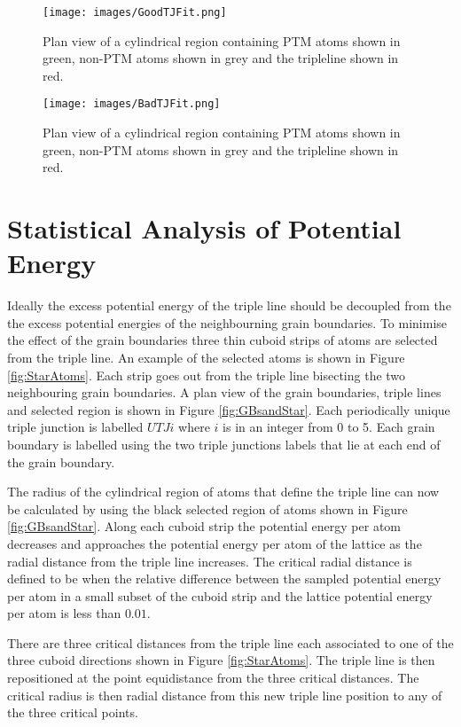 \documentclass[12pt,a4paper]{book}
\begin{document}
\begin{figure}
	\texttt{[image: images/GoodTJFit.png]} 
	\caption{Plan view of a cylindrical region containing PTM atoms shown in green, non-PTM atoms shown in grey and the tripleline shown in red.}
\end{figure}
\begin{figure}
	\texttt{[image: images/BadTJFit.png]} 
	\caption{Plan view of a cylindrical region containing PTM atoms shown in green, non-PTM atoms shown in grey and the tripleline shown in red.}
\end{figure}
\section{Statistical Analysis of Potential Energy}


Ideally the excess potential energy of the triple line should be decoupled from the the excess potential energies of the neighbourning grain boundaries. To minimise the effect of the grain boundaries three thin cuboid strips of atoms are selected from the triple line. An example of the selected atoms is shown in Figure \ref{fig:StarAtoms}. Each strip goes out from the triple line bisecting the two neighbouring grain boundaries. A plan view of the grain boundaries, triple lines and selected region is shown in Figure \ref{fig:GBsandStar}. Each periodically unique triple junction is labelled $UTJi$ where $i$ is in an integer from 0 to 5. Each grain boundary is labelled using the two triple junctions labels that lie at each end of the grain boundary.

The radius of the cylindrical region of atoms that define the triple line can now be calculated by using the black selected region of atoms shown in Figure \ref{fig:GBsandStar}. Along each cuboid strip the potential energy per atom decreases and approaches the potential energy per atom of the lattice as the radial distance from the triple line increases. The critical radial distance is defined to be when the relative difference  between the sampled potential energy per atom in a small subset of the cuboid strip and the lattice potential energy per atom is less than $0.01$. 

There are three critical distances from the triple line each associated to one of the three cuboid directions shown in Figure \ref{fig:StarAtoms}. The triple line is then repositioned at the point equidistance from the three critical distances. The critical radius is then radial distance from this new triple line position to any of the three critical points.       
\end{document}
